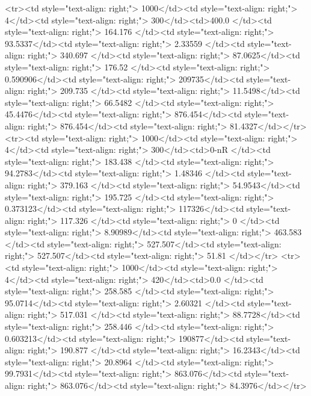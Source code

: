 <tr><td style="text-align: right;">      1000</td><td style="text-align: right;">         4</td><td style="text-align: right;">           300</td><td>400.0        </td><td style="text-align: right;">               164.176 </td><td style="text-align: right;">            93.5337</td><td style="text-align: right;">         2.33559 </td><td style="text-align: right;">        340.697 </td><td style="text-align: right;">            87.0625</td><td style="text-align: right;">             176.52    </td><td style="text-align: right;">             0.590906</td><td style="text-align: right;">              209735</td><td style="text-align: right;">                      209.735 </td><td style="text-align: right;">            11.5498</td><td style="text-align: right;">                66.5482 </td><td style="text-align: right;">        45.4476</td><td style="text-align: right;">    876.454</td><td style="text-align: right;">       876.454</td><td style="text-align: right;">                 81.4327</td></tr>
<tr><td style="text-align: right;">      1000</td><td style="text-align: right;">         4</td><td style="text-align: right;">           300</td><td>0-nR         </td><td style="text-align: right;">               183.438 </td><td style="text-align: right;">            94.2783</td><td style="text-align: right;">         1.48346 </td><td style="text-align: right;">        379.163 </td><td style="text-align: right;">            54.9543</td><td style="text-align: right;">             195.725   </td><td style="text-align: right;">             0.373123</td><td style="text-align: right;">              117326</td><td style="text-align: right;">                      117.326 </td><td style="text-align: right;">             0     </td><td style="text-align: right;">                 8.90989</td><td style="text-align: right;">       463.583 </td><td style="text-align: right;">    527.507</td><td style="text-align: right;">       527.507</td><td style="text-align: right;">                 51.81  </td></tr>
<tr><td style="text-align: right;">      1000</td><td style="text-align: right;">         4</td><td style="text-align: right;">           420</td><td>0.0          </td><td style="text-align: right;">               258.585 </td><td style="text-align: right;">            95.0714</td><td style="text-align: right;">         2.60321 </td><td style="text-align: right;">        517.031 </td><td style="text-align: right;">            88.7728</td><td style="text-align: right;">             258.446   </td><td style="text-align: right;">             0.603213</td><td style="text-align: right;">              190877</td><td style="text-align: right;">                      190.877 </td><td style="text-align: right;">            16.2343</td><td style="text-align: right;">                20.8964 </td><td style="text-align: right;">        99.7931</td><td style="text-align: right;">    863.076</td><td style="text-align: right;">       863.076</td><td style="text-align: right;">                 84.3976</td></tr>

